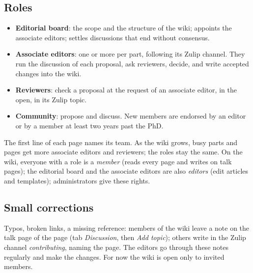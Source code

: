 \documentclass[11pt]{article}
\theoremstyle{definition}
\theoremstyle{remark}
\begin{document}
\subsection{Roles}
\begin{itemize}
  \item \textbf{Editorial board}: the scope and the structure of the wiki; appoints the associate editors; settles discussions that end without consensus.
  \item \textbf{Associate editors}: one or more per part, following its Zulip channel. They run the discussion of each proposal, ask reviewers, decide, and write accepted changes into the wiki.
  \item \textbf{Reviewers}: check a proposal at the request of an associate editor, in the open, in its Zulip topic.
  \item \textbf{Community}: propose and discuss. New members are endorsed by an editor or by a member at least two years past the PhD.
\end{itemize}
The first line of each page names its team. As the wiki grows, busy parts and pages get more associate editors and reviewers; the roles stay the same.
On the wiki, everyone with a role is a \emph{member} (reads every page and writes on talk pages); the editorial board and the associate editors are also \emph{editors} (edit articles and templates); administrators give these rights.

\subsection{Small corrections}
Typos, broken links, a missing reference: members of the wiki leave a note on the talk page of the page (tab \emph{Discussion}, then \emph{Add topic}); others write in the Zulip channel \emph{contributing}, naming the page. The editors go through these notes regularly and make the changes. For now the wiki is open only to invited members.
\end{document}

